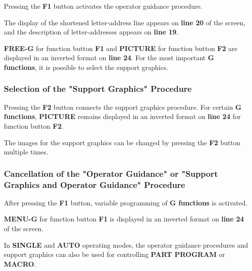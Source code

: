 \begin{itemize}
\end{itemize}

Pressing the \textbf{F1} button activates the operator guidance procedure.

The display of the shortened letter-address line appears on \textbf{line 20} of the screen, and the description of letter-addresses appears on \textbf{line 19}.

\textbf{FREE-G} for function button \textbf{F1} and \textbf{PICTURE} for function button \textbf{F2} are displayed in an inverted format on \textbf{line 24}. For the most important \textbf{G functions}, it is possible to select the support graphics.

\subsubsection*{Selection of the "Support Graphics" Procedure}

\begin{itemize}
\end{itemize}

Pressing the \textbf{F2} button connects the support graphics procedure. For certain \textbf{G functions}, \textbf{PICTURE} remains displayed in an inverted format on \textbf{line 24} for function button \textbf{F2}.

The images for the support graphics can be changed by pressing the \textbf{F2} button multiple times.

\subsubsection*{Cancellation of the "Operator Guidance" or "Support Graphics and Operator Guidance" Procedure}

\begin{itemize}
\end{itemize}

After pressing the \textbf{F1} button, variable programming of \textbf{G functions} is activated.

\textbf{MENU-G} for function button \textbf{F1} is displayed in an inverted format on \textbf{line 24} of the screen.

\notes

In \textbf{SINGLE} and \textbf{AUTO} operating modes, the operator guidance procedures and support graphics can also be used for controlling \textbf{PART PROGRAM} or \textbf{MACRO}.